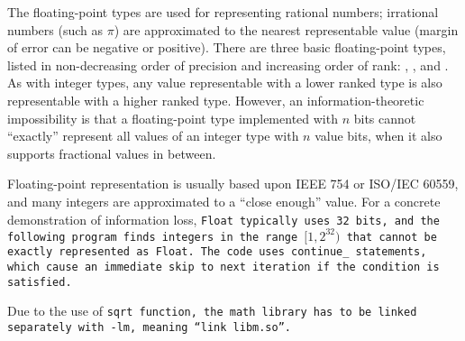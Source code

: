 The floating-point types are used for representing rational numbers;
irrational numbers (such as $\pi$) are approximated to the nearest
representable value (margin of error can be negative or positive).
There are three basic floating-point types,
listed in non-decreasing order of precision and increasing order of rank:
, , and .
As with integer types, any value representable with a lower
ranked type is also representable with a higher ranked type.
However, an information-theoretic impossibility is that a floating-point type
implemented with $n$ bits cannot ``exactly'' represent all values of an integer
type with $n$ value bits, when it also supports fractional values in between.

\example Floating-point representation is usually based upon IEEE 754 or
ISO/IEC 60559, and many integers are approximated to a ``close enough'' value.
For a concrete demonstration of information loss, \tt{Float} typically
uses 32 bits, and the following program finds integers in the range
$[1, 2^{32})$ that cannot be exactly represented as \tt{Float}.
The code uses \tt{continue_} statements,
which cause an immediate skip to next iteration if the condition is satisfied.


Due to the use of \tt{sqrt} function, the math library has to be
linked separately with \tt{-lm}, meaning ``link \tt{libm.so}''.

